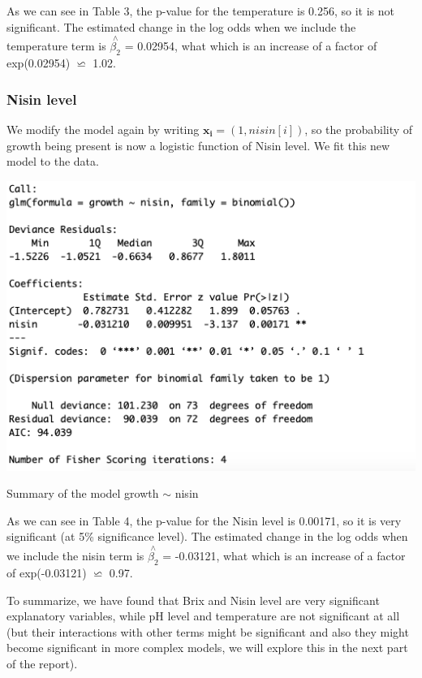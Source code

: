 \documentclass{article}
\begin{document}
As we can see in Table 3, the p-value for the temperature is 0.256, so it is not significant.
The estimated change in the log odds when we include the temperature term is $\overset{\wedge}{\beta_2} $ = 0.02954, what which is an increase of a factor of exp(0.02954) $\backsimeq $ 1.02.
\subsubsection{Nisin level}
We modify the model again by writing $ \boldsymbol{x_i}=(1,nisin[i]) $, so the probability of growth being present is now a logistic function of Nisin level. We fit this new model to the data. 

\begin{table}[h!]
\includegraphics[scale = 0.5]{table2.png}
\caption{Summary of the model growth $\sim$ nisin}
\end{table}

As we can see in Table 4, the p-value for the Nisin level is 0.00171, so it is very significant (at 5\% significance level). The estimated change in the log odds when we include the nisin term is $\overset{\wedge}{\beta_2} $ = -0.03121, what which is an increase of a factor of exp(-0.03121) $\backsimeq $ 0.97.

To summarize, we have found that Brix and Nisin level are very significant explanatory variables, while pH level and temperature are not significant at all (but their interactions with other terms might be significant and also they might become significant in more complex models, we will explore this in the next part of the report).  
\end{document}
